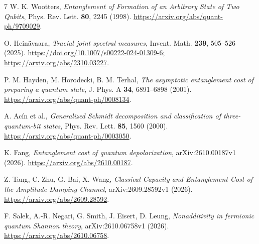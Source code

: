 \documentclass[10pt,letterpaper]{article}
\begin{document}
\newpage
\begin{thebibliography}{7}
W. K. Wootters, \emph{Entanglement of Formation of an Arbitrary State of Two Qubits}, Phys. Rev. Lett. \textbf{80}, 2245 (1998). \url{https://arxiv.org/abs/quant-ph/9709029}.

O. Heinävaara, \emph{Tracial joint spectral measures}, Invent. Math. \textbf{239}, 505--526 (2025). \url{https://doi.org/10.1007/s00222-024-01309-6}; \url{https://arxiv.org/abs/2310.03227}.

P. M. Hayden, M. Horodecki, B. M. Terhal, \emph{The asymptotic entanglement cost of preparing a quantum state}, J. Phys. A \textbf{34}, 6891--6898 (2001). \url{https://arxiv.org/abs/quant-ph/0008134}.

A. Acín et al., \emph{Generalized Schmidt decomposition and classification of three-quantum-bit states}, Phys. Rev. Lett. \textbf{85}, 1560 (2000). \url{https://arxiv.org/abs/quant-ph/0003050}.

K. Fang, \emph{Entanglement cost of quantum depolarization}, arXiv:2610.00187v1 (2026). \url{https://arxiv.org/abs/2610.00187}.

Z. Tang, C. Zhu, G. Bai, X. Wang, \emph{Classical Capacity and Entanglement Cost of the Amplitude Damping Channel}, arXiv:2609.28592v1 (2026). \url{https://arxiv.org/abs/2609.28592}.

F. Salek, A.-R. Negari, G. Smith, J. Eisert, D. Leung, \emph{Nonadditivity in fermionic quantum Shannon theory}, arXiv:2610.06758v1 (2026). \url{https://arxiv.org/abs/2610.06758}.
\end{thebibliography}
\end{document}
